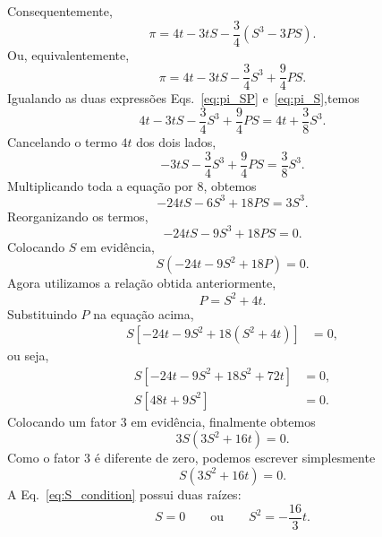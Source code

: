 \documentclass[11pt,a4paper]{article}
\begin{document}
%
Consequentemente,
%
\begin{equation}
    \pi
    =
    4t-3tS
    -\frac34(S^3-3PS).
\end{equation}
%
Ou, equivalentemente,
%
\begin{equation}
    \pi
    =
    4t-3tS
    -\frac34S^3
    +\frac94PS.
\label{eq:pi_SP}
\end{equation}
%
Igualando as duas expressões Eqs.~\eqref{eq:pi_SP}
e~\eqref{eq:pi_S},temos
%
\begin{equation}
    4t-3tS
    -\frac34S^3
    +\frac94PS
    =
    4t+\frac38S^3.
\end{equation}
%
Cancelando o termo $4t$ dos dois lados,
%
\begin{equation}
    -3tS
    -\frac34S^3
    +\frac94PS
    =
    \frac38S^3.
\end{equation}
%
Multiplicando toda a equação por $8$, obtemos
%
\begin{equation}
    -24tS-6S^3+18PS=3S^3.
\end{equation}
%
Reorganizando os termos,
%
\begin{equation}
    -24tS-9S^3+18PS=0.
\end{equation}
%
Colocando $S$ em evidência,
%
\begin{equation}
    S\left(-24t-9S^2+18P\right)=0.
\end{equation}
%
Agora utilizamos a relação obtida anteriormente,
%
\begin{equation}
    P=S^2+4t.
\end{equation}
%
Substituindo $P$ na equação acima,
%
\begin{align}
    S\left[
    -24t-9S^2+18(S^2+4t)
    \right]
    &=0,
\end{align}
%
ou seja,
%
\begin{align}
    S\left[
    -24t-9S^2+18S^2+72t
    \right]
    &=0,
    \nonumber\\
    S\left[
    48t+9S^2
    \right]
    &=0.
\end{align}
%
Colocando um fator $3$ em evidência, finalmente obtemos
%
\begin{equation}
    3S(3S^2+16t)=0.
\end{equation}
%
Como o fator $3$ é diferente de zero, podemos escrever simplesmente
%
\begin{equation}
    S(3S^2+16t)=0.
\label{eq:S_condition}
\end{equation}
%
A Eq.~\eqref{eq:S_condition} possui duas raízes:
%
\begin{equation}
    S=0
    \qquad\text{ou}\qquad
    S^2=-\frac{16}{3}t.
\end{equation}
\end{document}
